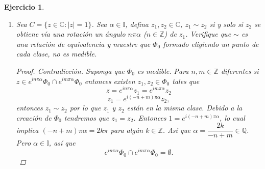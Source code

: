 \documentclass[twoside,12pt,a4 paper,openright]{book}
\newtheorem{ejer}[claim]{Ejercicio}
\begin{document}
\begin{ejer}
\begin{enumerate}
\begin{proof}
\begin{enumerate}
  
 \noindent
 Note que si $x \in  ( A +  \dfrac{1}{n} ) \cap A$,  con $n\geq N$, entonces existen $a,b\in A$ tales que 
  $   x = a + \dfrac{1}{n} = b $. Luego $|a-b | =\dfrac{1}{n}$. Lo cual no puede ocurrir. As\'i que $(  A +  \dfrac{1}{n} ) \cap A = \emptyset$ para cada $n\geq N$. De forma similar se verifica que  si $n,m\in \mathbb N$ son diferentes entonces $(  A +  \dfrac{1}{n} ) \cap ( A +  \dfrac{1}{n} ) = \emptyset$.
  
  \noindent
  Por lo anterior $\bigcup _{n\geq N}(  A +  \dfrac{1}{n} )\subset [0,1]$ y $$\infty =   \sum_{n\geq N} \mu (A ) =   \sum_{n\geq N} \mu (A+\dfrac{1}{n}) 
  = \mu( \ \bigcup _{n\geq N}(  A +  \dfrac{1}{n} ) \  ) 
  \leq \mu([0,1])=1 . $$
 Lo cual es una contradicci\'on.
 
 
 \item En caso de que $\sup A=1$. Por la propiedad Arquimediana existe  $N\in \mathbb N$ tal que $\dfrac{1}{N}< \mu(A) $.  Note que el conjunto $B= A\setminus [1-\dfrac{1}{N}, 1]$ tiene medida positiva      y que ning\'un par de elementos de  $B$ tienen distancia un n\'umero racional. Ya que 
 $\mu (B) \geq  \mu ( A ) -\dfrac{1}{N} > 0$ y $B\subset A$. Adem\'as, $\sup B   \leq 1-\dfrac{1}{N}< 1$. Por el caso anterior llegaremos a una contradicci\'on.
 \end{enumerate}
  
  \end{proof}
  
\item Sea $C = \{z\in \mathbb{C} : |z| = 1\}$. Sea $\alpha\in \mathbb I$, defina $z_1,z_2\in \mathbb{C}$, $z_1\sim z_2$ si y solo si $z_2$ se obtiene v\'ia una rotaci\'on un \'angulo $n\pi \alpha$  ($n\in \mathbb{Z}$) de $z_1$. Verifique que $\sim$ es una relaci\'on de equivalencia y muestre que $\Phi_0$ formado eligiendo un punto de cada clase, no es medible.

\begin{proof}
Contradicci\'on.   Suponga que $\Phi_0$  es medible. Para $n,m\in\mathbb Z$ diferentes si $z \in  e^{i n\pi \alpha } \Phi_0 \cap  e^{i m\pi \alpha } \Phi_0$
 entonces existen $z_1, z_2 \in \Phi_0$ tales que $$z=e^{i n\pi \alpha } z_1 = e^{i m\pi \alpha } z_2$$
$$z_1 = e^{i(- n+m)\pi \alpha } z_2,$$
entonces  $z_1\sim z_2$ por lo que $z_1$ y $z_2$ est\'an en la misma clase. Debido a la creaci\'on de $\Phi_0$ tendremos que $z_1=z_2$.  Entonces 
 $1 = e^{i(- n+m)\pi \alpha }$, lo cual implica $(- n+m)\pi \alpha = 2k\pi$ para alg\'un $k\in \mathbb Z$. As\'i que 
 $  \alpha =\dfrac{ 2k}{ - n+m}\in \mathbb Q$. Pero $\alpha\in \mathbb I$, as\'i que  
 $$ e^{i n\pi \alpha } \Phi_0 \cap  e^{i m\pi \alpha } \Phi_0 =\emptyset.$$


\end{proof}
\end{enumerate}
\end{ejer}
\end{document}
